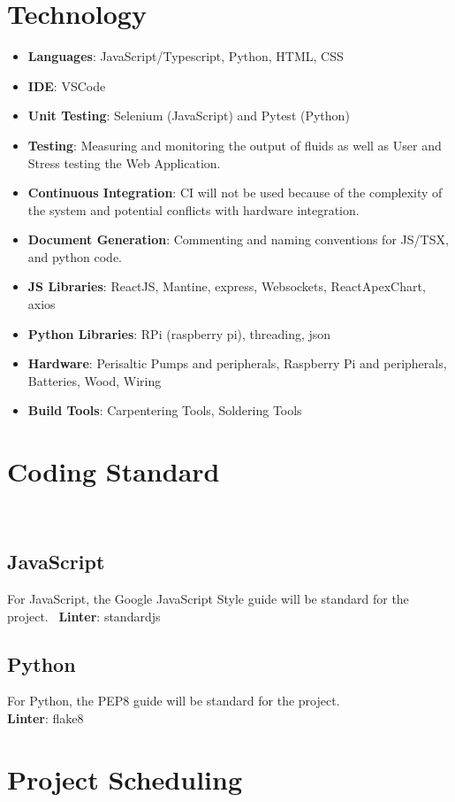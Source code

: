 \documentclass{article}
\begin{document}
\section{Technology}

\begin{itemize}
\item \textbf{Languages}: JavaScript/Typescript, Python, HTML, CSS
\item\textbf{IDE}: VSCode
\item \textbf{Unit Testing}: Selenium (JavaScript) and Pytest (Python)
\item \textbf{Testing}: Measuring and monitoring the output of fluids as well as User and Stress testing the Web Application.
\item \textbf{Continuous Integration}: CI will not be used because of the complexity of the system and potential conflicts with hardware integration.
\item \textbf{Document Generation}: Commenting and naming conventions for JS/TSX, and python code.
\item \textbf{JS Libraries}: ReactJS, Mantine, express, Websockets, ReactApexChart, axios
\item \textbf{Python Libraries}: RPi (raspberry pi), threading, json
\item \textbf{Hardware}: Perisaltic Pumps and peripherals, Raspberry Pi and peripherals, Batteries, Wood, Wiring
\item \textbf{Build Tools}:  Carpentering Tools, Soldering Tools
\end{itemize}

\section{Coding Standard}
\\
\subsection{JavaScript}
For JavaScript, the Google JavaScript Style guide will be standard for the project.
\ \textbf{Linter}: standardjs
\subsection{Python}
For Python, the PEP8 guide will be standard for the project.
\\ \textbf{Linter}: flake8
\section{Project Scheduling}
\end{document}
